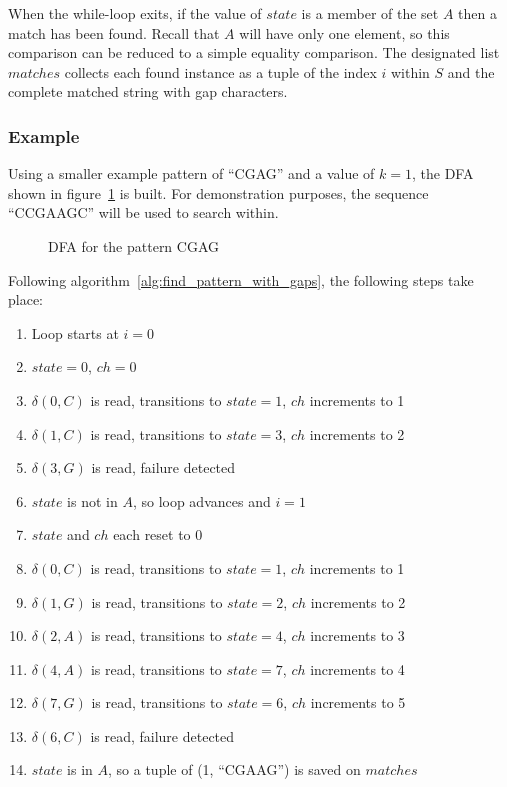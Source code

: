 When the while-loop exits, if the value of $state$ is a member of the set $A$ then a match has been found. Recall that $A$ will have only one element, so this comparison can be reduced to a simple equality comparison. The designated list $matches$ collects each found instance as a tuple of the index $i$ within $S$ and the complete matched string with gap characters.

\subsubsection{Example}

Using a smaller example pattern of ``CGAG'' and a value of $k=1$, the DFA shown in figure~\ref{fig:dfa_example} is built. For demonstration purposes, the sequence ``CCGAAGC'' will be used to search within.

\begin{figure}[ht]
\centering

\caption{DFA for the pattern CGAG}
\label{fig:dfa_example}
\end{figure}

Following algorithm~\ref{alg:find_pattern_with_gaps}, the following steps take place:

\begin{enumerate}
\item Loop starts at $i=0$
\item $state=0$, $ch=0$
\item $\delta(0,C)$ is read, transitions to $state=1$, $ch$ increments to 1
\item $\delta(1,C)$ is read, transitions to $state=3$, $ch$ increments to 2
\item $\delta(3,G)$ is read, failure detected
\item $state$ is not in $A$, so loop advances and $i=1$
\item $state$ and $ch$ each reset to 0
\item $\delta(0,C)$ is read, transitions to $state=1$, $ch$ increments to 1
\item $\delta(1,G)$ is read, transitions to $state=2$, $ch$ increments to 2
\item $\delta(2,A)$ is read, transitions to $state=4$, $ch$ increments to 3
\item $\delta(4,A)$ is read, transitions to $state=7$, $ch$ increments to 4
\item $\delta(7,G)$ is read, transitions to $state=6$, $ch$ increments to 5
\item $\delta(6,C)$ is read, failure detected
\item $state$ is in $A$, so a tuple of (1, ``CGAAG'') is saved on $matches$
\end{enumerate}

